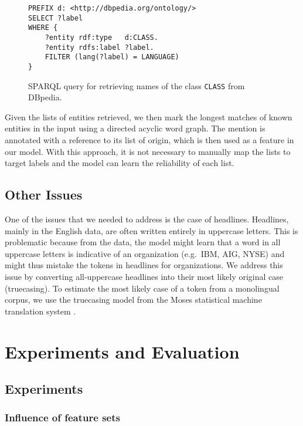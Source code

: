 \documentclass[11pt]{article}
\begin{document}
\begin{figure}
\begin{verbatim}
PREFIX d: <http://dbpedia.org/ontology/>
SELECT ?label
WHERE {
    ?entity rdf:type   d:CLASS.
    ?entity rdfs:label ?label.
    FILTER (lang(?label) = LANGUAGE)
}
\end{verbatim}
\caption{SPARQL query for retrieving names of the class \texttt{CLASS} from DBpedia.}
\label{fig:sparql}

\end{figure}

Given the lists of entities retrieved, we then mark the longest matches of known entities in the input using a directed acyclic word graph. The mention is annotated with a reference to its list of origin, which is then used as a feature in our model. With this approach, it is not necessary to manually map the lists to target labels and the model can learn the reliability of each list.


\subsection{Other Issues}

One of the issues that we needed to address is the case of headlines. Headlines, mainly in the English data, are often written entirely in uppercase letters. This is problematic because from the data, the model might learn that a word in all uppercase letters is indicative of an organization (e.g.\ IBM, AIG, NYSE) and might thus mistake the tokens in headlines for organizations. We address this issue by converting all-uppercase headlines into their most likely original case (truecasing). To estimate the most likely case of a token from a monolingual corpus, we use the truecasing model from the Moses statistical machine translation system \cite{koehn2007moses}. 





\section{Experiments and Evaluation}

\subsection{Experiments}

\subsubsection{Influence of feature sets}
\end{document}
